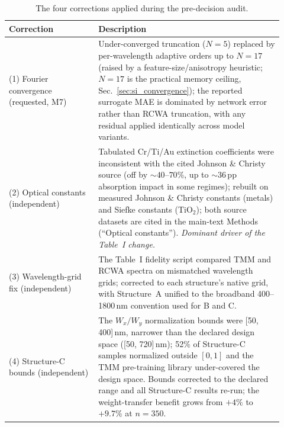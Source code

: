 \documentclass[11pt]{article}
\begin{document}
\begin{table}[htbp]\centering\small
\caption{The four corrections applied during the pre-decision audit.}
\label{tab:si_changelog}
\begin{tabular}{p{0.30\linewidth} p{0.62\linewidth}}\toprule
\textbf{Correction} & \textbf{Description}\\\midrule
(1) Fourier convergence \newline (requested, M7) &
Under-converged truncation ($N=5$) replaced by per-wavelength adaptive orders up
to $N=17$ (raised by a feature-size/anisotropy heuristic; $N=17$ is the practical
memory ceiling, Sec.~\ref{sec:si_convergence}); the reported surrogate MAE is
dominated by network error rather than RCWA truncation, with any residual applied
identically across model variants.\\[0.4em]
(2) Optical constants \newline (independent) &
Tabulated Cr/Ti/Au extinction coefficients were inconsistent with the cited
Johnson \& Christy source (off by ${\sim}40$--$70\%$, up to ${\sim}36$\,pp
absorption impact in some regimes); rebuilt on measured Johnson \& Christy
constants (metals) and Siefke constants (TiO$_2$); both source datasets are cited
in the main-text Methods (``Optical constants''). \emph{Dominant driver of the
Table~I change.}\\[0.4em]
(3) Wavelength-grid fix \newline (independent) &
The Table~I fidelity script compared TMM and RCWA spectra on mismatched
wavelength grids; corrected to each structure's native grid, with Structure~A
unified to the broadband 400--1800\,nm convention used for B and C.\\[0.4em]
(4) Structure-C bounds \newline (independent) &
The $W_x/W_y$ normalization bounds were [50, 400]\,nm, narrower than the declared
design space ([50, 720]\,nm); 52\% of Structure-C samples normalized outside
$[0,1]$ and the TMM pre-training library under-covered the design space. Bounds
corrected to the declared range and all Structure-C results re-run; the
weight-transfer benefit grows from $+4\%$ to $+9.7\%$ at $n=350$.\\\bottomrule
\end{tabular}
\end{table}
\end{document}
